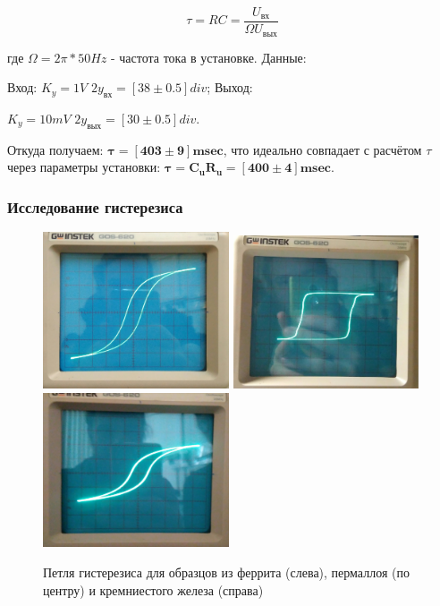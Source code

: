 \documentclass[a4paper,12pt]{article}
\begin{document}
\begin{equation}
\tau = RC = \frac{U_\text{вх}}{\Omega U_\text{вых}}
\end{equation}

где $\Omega = 2\pi * 50Hz$ - частота тока в установке.
Данные:

Вход:
$K_y = 1V$
$2y_\text{вх} = [38 \pm 0.5] div$; 
Выход:

$K_y = 10mV$
$2y_\text{вых} = [30 \pm 0.5] div$.

Откуда получаем: $\bm{\tau = [403 \pm 9]msec}$, что идеально совпадает с расчётом $\tau$ через параметры установки: $\bm{\tau = C_uR_u = [400 \pm 4]msec}$.

\subsubsection*{Исследование гистерезиса}

\begin{figure}[ht]
\centering
\includegraphics[width=55mm]{Ferrit.jpg} 
\includegraphics[width=55mm]{Perm.jpg}
\includegraphics[width=55mm]{Kremn_Ferr.jpg}
\caption{Петля гистерезиса для образцов из феррита (слева), пермаллоя (по центру) и кремниестого железа (справа)}\label{schema}
\end{figure}
\end{document}
